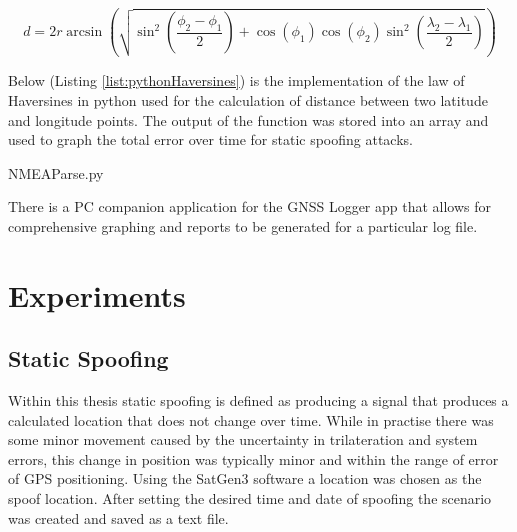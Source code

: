 \begin{equation} \label{eq:Haversine}
    d = 2r \arcsin\left(\sqrt{\sin^2\left(\frac{\phi_2 - \phi_1}{2}\right) + \cos\left(\phi_1\right)\cos\left(\phi_2\right)\sin^2\left(\frac{\lambda_2 - \lambda_1}{2}\right)}\right)
\end{equation}
 
Below (Listing \ref{list:pythonHaversines}) is the implementation of the law of Haversines in python used for the calculation of distance between two latitude and longitude points. The output of the function was stored
into an array and used to graph the total error over time for static spoofing attacks.


\begin{lstinputlisting}[language=Python, label=list:pythonHaversines, caption=Python implementation of the law of Haversines used to calculate the distance between two points on a sphere, firstline=23, lastline=29]{NMEAParse.py}
\end{lstinputlisting}

There is a PC companion application for the GNSS Logger app that allows for comprehensive
graphing and reports to be generated for a particular log file.


\section{Experiments}
\subsection{Static Spoofing}
Within this thesis static spoofing is defined as producing a signal that produces a calculated location that does not change over time. While in practise there was some
minor movement caused by the uncertainty in trilateration and system errors, this change in position was typically minor and within the range of error of GPS positioning.
Using the SatGen3 software a location was chosen as the spoof location. After setting the desired time and date of spoofing the scenario was created and saved as a text file. 

